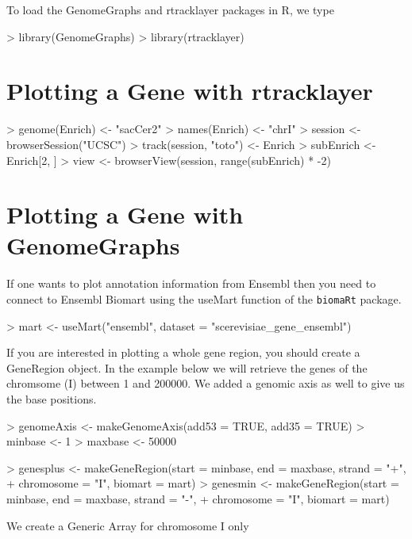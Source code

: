 \documentclass[11pt]{article}
\begin{document}
To load the GenomeGraphs and rtracklayer packages in R, we type 
\begin{Schunk}
\begin{Sinput}
> library(GenomeGraphs)
> library(rtracklayer)
\end{Sinput}
\end{Schunk}

\section{Plotting a Gene with rtracklayer}


\begin{Schunk}
\begin{Sinput}
> genome(Enrich) <- "sacCer2"
> names(Enrich) <- "chrI"
> session <- browserSession("UCSC")
> track(session, "toto") <- Enrich
> subEnrich <- Enrich[2, ]
> view <- browserView(session, range(subEnrich) * -2)
\end{Sinput}
\end{Schunk}


\section{Plotting a Gene with GenomeGraphs}
If one wants to plot annotation information from Ensembl then you need to connect to Ensembl Biomart using the useMart function of the \texttt{biomaRt} package.

\begin{Schunk}
\begin{Sinput}
> mart <- useMart("ensembl", dataset = "scerevisiae_gene_ensembl")
\end{Sinput}
\end{Schunk}


If you are interested in plotting a whole gene region, you should create a GeneRegion object.
In the example below we will retrieve the genes of the chromsome (I) between 1 and 200000. We added a genomic axis as well to give us the base positions.

\begin{Schunk}
\begin{Sinput}
> genomeAxis <- makeGenomeAxis(add53 = TRUE, add35 = TRUE)
> minbase <- 1
> maxbase <- 50000
\end{Sinput}
\end{Schunk}

\begin{Schunk}
\begin{Sinput}
> genesplus <- makeGeneRegion(start = minbase, end = maxbase, strand = "+", 
+     chromosome = "I", biomart = mart)
> genesmin <- makeGeneRegion(start = minbase, end = maxbase, strand = "-", 
+     chromosome = "I", biomart = mart)
\end{Sinput}
\end{Schunk}
We create a Generic Array for chromosome I only 
\end{document}
